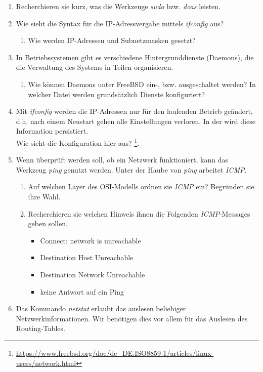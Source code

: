 \documentclass[paper=a4,fontsize=11pt]{scrartcl}%
\numberwithin{equation}{section}
\begin{document}
\begin{enumerate}
	\item Recherchieren sie kurz, was die Werkzeuge \emph{sudo} bzw. \emph{doas} leisten.
	\item Wie sieht die Syntax für die IP-Adressvergabe mittels \emph{ifconfig} aus?
	\begin{enumerate}
		\item Wie werden IP-Adressen und Subnetzmasken gesetzt?
	\end{enumerate}
	\item In Betriebssystemen gibt es verschiedene Hintergrunddienste (Daemons), die die Verwaltung des Systems in Teilen organisieren. 
	\begin{enumerate}
		\item Wie können Daemons unter FreeBSD ein-, bzw. ausgeschaltet werden? In welcher Datei werden grundsätzlich Dienste konfiguriert?
	\end{enumerate}
	\item Mit \emph{ifconfig} werden die IP-Adressen nur für den laufenden Betrieb geändert, d.h. nach einem Neustart gehen alle Einstellungen verloren. In der  wird diese Information persistiert.\\
	Wie sieht die Konfiguration hier aus? \footnote{\url{https://www.freebsd.org/doc/de_DE.ISO8859-1/articles/linux-users/network.html}}.
	\item Wenn überprüft werden soll, ob ein Netzwerk funktioniert, kann das Werkzeug \emph{ping} genutzt werden. Unter der Haube von \emph{ping} arbeitet \emph{ICMP}.
	\begin{enumerate}
		\item Auf welchen Layer des OSI-Modells ordnen sie \emph{ICMP} ein? Begründen sie ihre Wahl.
	\item Recherchieren sie welchen Hinweis ihnen die Folgenden \emph{ICMP}-Messages geben sollen.
	\begin{itemize}
		\item Connect: network is unreachable
		\item Destination Host Unreachable
		\item Destination Network Unreachable
		\item keine Antwort auf ein Ping
	\end{itemize}
	\end{enumerate}
	\item Das Kommando \emph{netstat} erlaubt das auslesen beliebiger Netzwerkinformationen. Wir benötigen dies vor allem für das Auslesen des Routing-Tables.

\end{enumerate}
\end{document}
